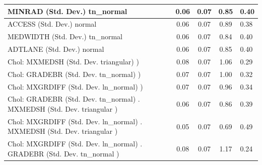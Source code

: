 \begin{table}
\begin{center}
\begin{tabular}{|l|l|c|c|c|l|}
			\hline
			MINRAD (Std. Dev.) tn_normal &  & 0.06 & 0.07 & 0.85 & 0.40 \\
			\hline
			ACCESS (Std. Dev.) normal &  & 0.06 & 0.07 & 0.89 & 0.38 \\
			\hline
			MEDWIDTH (Std. Dev.) tn_normal &  & 0.06 & 0.07 & 0.84 & 0.40 \\
			\hline
			ADTLANE (Std. Dev.) normal &  & 0.06 & 0.07 & 0.85 & 0.40 \\
			\hline
			 Chol: MXMEDSH (Std. Dev. triangular) ) &  & 0.08 & 0.07 & 1.06 & 0.29 \\
			\hline
			 Chol: GRADEBR (Std. Dev. tn_normal) ) &  & 0.07 & 0.07 & 1.00 & 0.32 \\
			\hline
			 Chol: MXGRDIFF (Std. Dev. ln_normal) ) &  & 0.07 & 0.07 & 0.96 & 0.34 \\
			\hline
			 Chol: GRADEBR (Std. Dev. tn_normal) . MXMEDSH (Std. Dev.   triangular ) &  & 0.06 & 0.07 & 0.86 & 0.39 \\
			\hline
			 Chol: MXGRDIFF (Std. Dev. ln_normal) . MXMEDSH (Std. Dev.   triangular ) &  & 0.05 & 0.07 & 0.69 & 0.49 \\
			\hline
			 Chol: MXGRDIFF (Std. Dev. ln_normal) . GRADEBR (Std. Dev.   tn_normal ) &  & 0.08 & 0.07 & 1.17 & 0.24 \\
			\hline
		\end{tabular}
	\end{center}
\end{table}